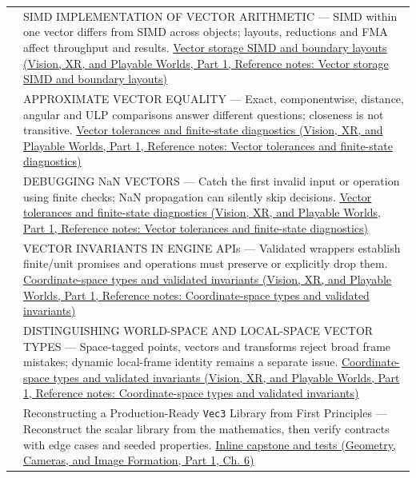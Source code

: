 {\begin{longtable}[]{@{}
  >{\raggedright\arraybackslash}p{}
  >{\raggedright\arraybackslash}p{}@{}}
595 & SIMD IMPLEMENTATION OF VECTOR ARITHMETIC --- SIMD within one vector differs from SIMD across objects; layouts, reductions and FMA affect throughput and results. \href{../07-Vision-XR-and-Playable-Worlds-P01/main.pdf\#nameddest=appendix-26bf6bf2fb8b}{Vector storage SIMD and boundary layouts (Vision, XR, and Playable Worlds, Part 1, Reference notes: Vector storage SIMD and boundary layouts)} \\
596 & APPROXIMATE VECTOR EQUALITY --- Exact, componentwise, distance, angular and ULP comparisons answer different questions; closeness is not transitive. \href{../07-Vision-XR-and-Playable-Worlds-P01/main.pdf\#nameddest=appendix-b5b83329215b}{Vector tolerances and finite-state diagnostics (Vision, XR, and Playable Worlds, Part 1, Reference notes: Vector tolerances and finite-state diagnostics)} \\
597 & DEBUGGING NaN VECTORS --- Catch the first invalid input or operation using finite checks; NaN propagation can silently skip decisions. \href{../07-Vision-XR-and-Playable-Worlds-P01/main.pdf\#nameddest=appendix-b5b83329215b}{Vector tolerances and finite-state diagnostics (Vision, XR, and Playable Worlds, Part 1, Reference notes: Vector tolerances and finite-state diagnostics)} \\
598 & VECTOR INVARIANTS IN ENGINE APIs --- Validated wrappers establish finite/unit promises and operations must preserve or explicitly drop them. \href{../07-Vision-XR-and-Playable-Worlds-P01/main.pdf\#nameddest=appendix-380a220e2529}{Coordinate-space types and validated invariants (Vision, XR, and Playable Worlds, Part 1, Reference notes: Coordinate-space types and validated invariants)} \\
599 & DISTINGUISHING WORLD-SPACE AND LOCAL-SPACE VECTOR TYPES --- Space-tagged points, vectors and transforms reject broad frame mistakes; dynamic local-frame identity remains a separate issue. \href{../07-Vision-XR-and-Playable-Worlds-P01/main.pdf\#nameddest=appendix-380a220e2529}{Coordinate-space types and validated invariants (Vision, XR, and Playable Worlds, Part 1, Reference notes: Coordinate-space types and validated invariants)} \\
600 & Reconstructing a Production-Ready \texttt{Vec3} Library from First Principles --- Reconstruct the scalar library from the mathematics, then verify contracts with edge cases and seeded properties. \href{../03-Geometry-Cameras-and-Image-Formation-P01/main.pdf\#nameddest=02-foundations-ii-ch037-a-complete-scalar-laboratory-makes-the-story-executable}{Inline capstone and tests (Geometry, Cameras, and Image Formation, Part 1, Ch. 6)} \\
\end{longtable}
}

